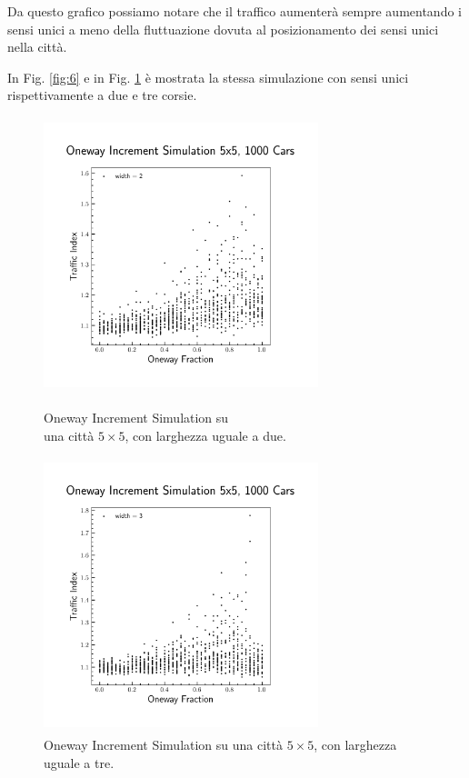 \documentclass[main.tex]{subfiles}
\begin{document}
        Da questo grafico possiamo notare che il traffico aumenterà sempre aumentando i sensi unici a meno della fluttuazione dovuta
        al posizionamento dei sensi unici nella città.

        In Fig. \ref{fig:6} e in Fig. \ref{fig:7} è mostrata la stessa simulazione con sensi unici rispettivamente a due e tre corsie.

        \begin{figure}[H]
            \begin{minipage}{.5\textwidth}
                \centering
                \includegraphics[width=8cm, height=8cm]{oneway_increment_2.png}  
                \caption{Oneway Increment Simulation su\\ una città $5 \times 5$, con larghezza uguale a due.}
                \label{fig:6}
            \end{minipage}
            \begin{minipage}{.5\textwidth}
                \centering
                \includegraphics[width=8cm, height=8cm]{oneway_increment_3.png}  
                \caption{Oneway Increment Simulation su una città $5 \times 5$, con larghezza uguale a tre.}
                \label{fig:7}
            \end{minipage}
        \end{figure}
\end{document}
